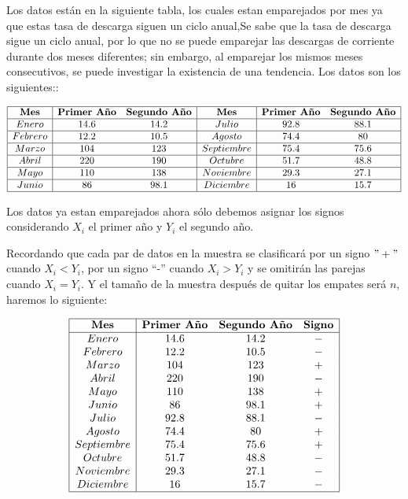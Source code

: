 \documentclass[
  a4paper,
  oneside,
  openany]{book}
\begin{document}
Los datos están en la siguiente tabla, los cuales estan emparejados por mes ya que estas tasa de descarga siguen un ciclo anual,Se sabe que la tasa de descarga sigue un ciclo anual, por lo que no se puede emparejar las descargas de corriente durante dos meses diferentes; sin embargo, al emparejar los mismos meses consecutivos, se puede investigar la existencia de una tendencia. Los datos son los siguientes::

\[
\begin{array}{|c| c c|c| c c|} 
\hline
\textbf{Mes} & \textbf{Primer Año} & \textbf{Segundo Año} & \textbf{Mes} & \textbf{Primer Año} & \textbf{Segundo Año}\\
\hline
Enero & 14.6 & 14.2 & Julio & 92.8 & 88.1 \\
\hline
Febrero&12.2&10.5&Agosto&74.4&80 \\
\hline
Marzo&104&123&Septiembre&75.4&75.6 \\
\hline
Abril&220&190&Octubre&51.7&48.8 \\
\hline
Mayo&110&138&Noviembre&29.3&27.1 \\
\hline
Junio&86&98.1&Diciembre&16&15.7 \\
\hline
\end{array}
\]

Los datos ya estan emparejados ahora sólo debemos asignar los signos considerando \(X_i\) el primer año y \(Y_i\) el segundo año.

Recordando que cada par de datos en la muestra se clasificará por un signo \("+"\) cuando \(X_{i} < Y_{i}\), por un signo ``-'' cuando \(X_{i} > Y_{i}\) y se omitirán las parejas cuando \(X_i = Y_i\). Y el tamaño de la muestra después de quitar los empates será \(n\), haremos lo siguiente:

\[
\begin{array}{|c|c c c|} 
\hline
\textbf{Mes} & \textbf{Primer Año} & \textbf{Segundo Año}&\textbf{Signo}\\
\hline
Enero&14.6&14.2&- \\
Febrero&12.2&10.5&-\\
Marzo&104&123&+ \\
Abril&220&190&- \\
Mayo&110&138&+ \\
Junio&86&98.1&+ \\
Julio&92.8&88.1&-\\
Agosto&74.4&80&+ \\
Septiembre&75.4&75.6&+ \\
Octubre&51.7&48.8&- \\
Noviembre&29.3&27.1&- \\
Diciembre&16&15.7&-\\
\hline
\end{array}
\]
\end{document}
